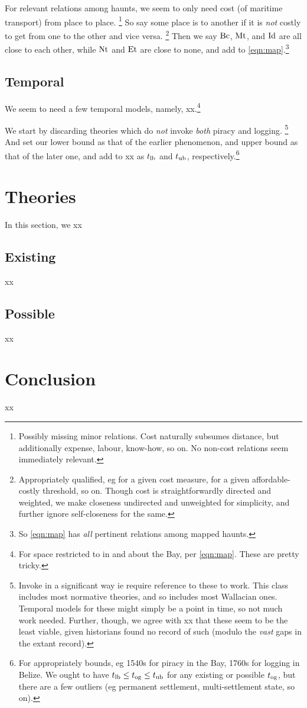 		For relevant relations among haunts, we seem to only need cost (of maritime transport) from place to place.%
		\footnote{Possibly missing minor relations. Cost naturally subsumes distance, but additionally expense, labour, know-how, so on. No non-cost relations seem immediately relevant.}
		So say some place is  to another if it is \emph{not} costly to get from one to the other and vice versa.%
		\footnote{Appropriately qualified, eg for a given cost measure, for a given affordable-costly threshold, so on. Though cost is straightforwardly directed and weighted, we make closeness undirected and unweighted for simplicity, and further ignore self-closeness for the same.}
		Then we say \(\operatorname{Bc}\), \(\operatorname{Mt}\), and \(\operatorname{Id}\) are all close to each other, while \(\operatorname{Nt}\) and \(\operatorname{Et}\) are close to none, and add to \ref{eqn:map}.\footnote{So \ref{eqn:map} has \emph{all} pertinent relations among mapped haunts.}
	\subsection{Temporal}
	\label{ss:temporal}
		We seem to need a few temporal models, namely, xx.\footnote{For space restricted to in and about the Bay, per \ref{eqn:map}. These are pretty tricky.}
	
		We start by discarding theories which do \emph{not} invoke \emph{both} piracy and logging.%
		\footnote{Invoke in a significant way ie require reference to these to work. This class includes most normative theories, and so includes most Wallacian ones. Temporal models for these might simply be a point in time, so not much work needed. Further, though, we agree with xx that these seem to be the least viable, given historians found no record of such (modulo the \emph{vast} gaps in the extant record).}
		And set our lower bound as that of the earlier phenomenon, and upper bound as that of the later one, and add to xx as \(t_{\operatorname{lb}}\) and \(t_{\operatorname{ub}}\), respectively.\footnote{For appropriately bounds, eg 1540s for piracy in the Bay, 1760s for logging in Belize. We ought to have \(t_{\operatorname{lb}}\leq t_{\operatorname{og}}\leq t_{\operatorname{ub}}\) for any existing or possible \(t_{\operatorname{og}}\), but there are a few outliers (eg permanent settlement, multi-settlement state, so on).}
%
%
%
\section{Theories}
\label{s:theories}
	In this section, we xx
	\subsection{Existing}
	\label{ss:existing}
		xx
	\subsection{Possible}
	\label{ss:possible}
		xx
%
%
%
\section{Conclusion}
\label{s:concl}
	xx
%
%
%
